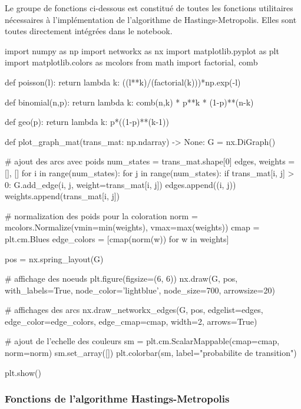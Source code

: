 \documentclass{article}
\begin{document}
Le groupe de fonctions ci-dessous est constitué de toutes les fonctions utilitaires nécessaires à l'implémentation de l'algorithme de Hastings-Metropolis. Elles sont toutes directement intégrées dans le notebook.
\begin{python}
    import numpy as np
    import networkx as nx
    import matplotlib.pyplot as plt
    import matplotlib.colors as mcolors
    from math import factorial, comb
    
    def poisson(l):
        return lambda k: ((l**k)/(factorial(k)))*np.exp(-l)
    
    def binomial(n,p):
        return lambda k: comb(n,k) * p**k * (1-p)**(n-k)
    
    def geo(p):
        return lambda k: p*((1-p)**(k-1))
    
    
    def plot_graph_mat(trans_mat: np.ndarray) -> None:
        G = nx.DiGraph()
    
        # ajout des arcs avec poids
        num_states = trans_mat.shape[0]
        edges, weights = [], [] 
        for i in range(num_states):
            for j in range(num_states):
                if trans_mat[i, j] > 0:
                    G.add_edge(i, j, weight=trans_mat[i, j])
                    edges.append((i, j))
                    weights.append(trans_mat[i, j])
    
        # normalization des poids pour la coloration
        norm = mcolors.Normalize(vmin=min(weights), vmax=max(weights))
        cmap = plt.cm.Blues  
        edge_colors = [cmap(norm(w)) for w in weights]
    
        pos = nx.spring_layout(G)
    
        # affichage des noeuds
        plt.figure(figsize=(6, 6))
        nx.draw(G, pos, with_labels=True, node_color='lightblue', node_size=700, arrowsize=20)
    
        # affichages des arcs
        nx.draw_networkx_edges(G, pos, edgelist=edges, edge_color=edge_colors, edge_cmap=cmap, width=2, arrows=True)
    
        # ajout de l'echelle des couleurs
        sm = plt.cm.ScalarMappable(cmap=cmap, norm=norm)
        sm.set_array([])
        plt.colorbar(sm, label="probabilite de transition") 
    
        plt.show()    
\end{python}

\newpage
\subsubsection{Fonctions de l'algorithme Hastings-Metropolis}
\end{document}

